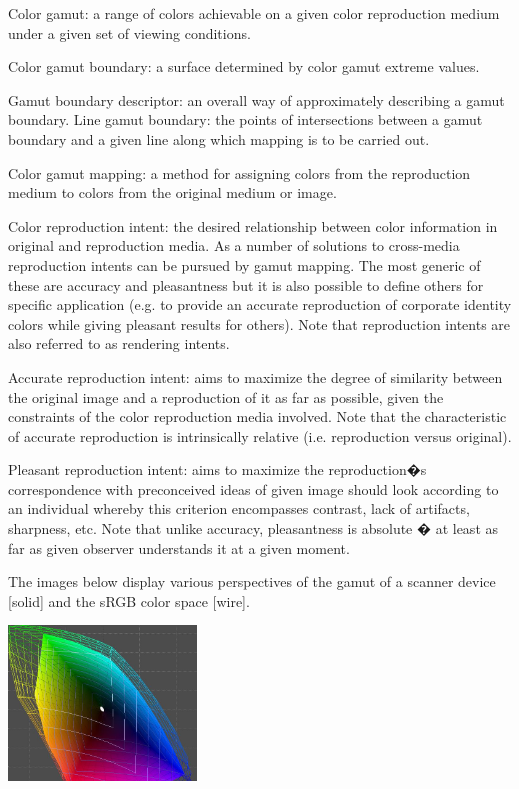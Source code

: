 Color gamut: a range of colors achievable on a given color reproduction medium under a given set of viewing conditions.

Color gamut boundary: a surface determined by color gamut extreme values.

Gamut boundary descriptor: an overall way of approximately describing a gamut boundary.
Line gamut boundary: the points of intersections between a gamut boundary and a given line along which mapping is to be carried out.

Color gamut mapping: a method for assigning colors from the reproduction medium to colors from the
original medium or image.

Color reproduction intent: the desired relationship between color information in original and
reproduction media. As a number of solutions to cross-media reproduction intents can be pursued by
gamut mapping. The most generic of these are accuracy and pleasantness but it is also possible to
define others for specific application (e.g. to provide an accurate reproduction of corporate
identity colors while giving pleasant results for others). Note that reproduction intents are also
referred to as rendering intents.

Accurate reproduction intent: aims to maximize the degree of similarity between the original image
and a reproduction of it as far as possible, given the constraints of the color reproduction media
involved. Note that the characteristic of accurate reproduction is intrinsically relative (i.e.
reproduction versus original).

Pleasant reproduction intent: aims to maximize the reproduction�s correspondence with preconceived
ideas of given image should look according to an individual whereby this criterion encompasses
contrast, lack of artifacts, sharpness, etc. Note that unlike accuracy, pleasantness is absolute � at
least as far as given observer understands it at a given moment.

The images below display various perspectives of the gamut of a scanner device [solid] and the sRGB color space [wire].

\includegraphics[width=5.0cm]{ColorPaper/aperio_sRGB_v1.jpg}

